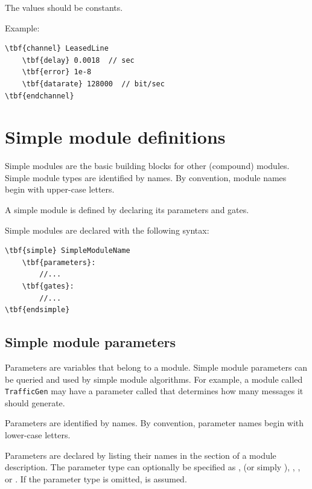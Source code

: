 The values should be constants.

Example:

\begin{Verbatim}[commandchars=\\\{\}]
\tbf{channel} LeasedLine
    \tbf{delay} 0.0018  // sec
    \tbf{error} 1e-8
    \tbf{datarate} 128000  // bit/sec
\tbf{endchannel}
\end{Verbatim}



\section{Simple module definitions}


Simple modules are the basic building blocks for other (compound)
modules. Simple module types are identified by names.
By convention, module names begin with upper-case letters.

A simple module is defined by
declaring its parameters and
gates.

Simple modules are declared with the following syntax:

\begin{Verbatim}[commandchars=\\\{\}]
\tbf{simple} SimpleModuleName
    \tbf{parameters}:
        //...
    \tbf{gates}:
        //...
\tbf{endsimple}
\end{Verbatim}



\subsection{Simple module parameters}
\label{sec:ch-ned-lang:simple-module-param}


Parameters are variables that belong to a module. Simple module
parameters can be queried and used by simple module algorithms.
For example, a module called \texttt{TrafficGen} may have a parameter
called  that determines how many messages it
should generate.

Parameters are identified by names.
By convention, parameter names begin with lower-case letters.

Parameters are declared by listing their names in the
 section of a module description.
The parameter type can optionally be specified as ,
 (or simply ), , ,
or . If the parameter type is omitted,  is assumed.

